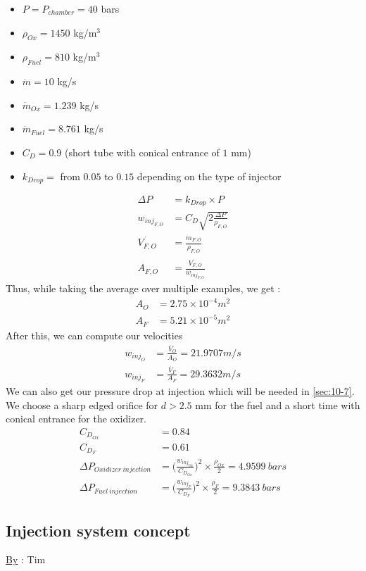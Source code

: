 \begin{itemize}
	\itemsep0em 
	\item $ P = P_{chamber} = 40$ bars
	\item $\rho_{Ox} = 1450$ kg/m$^3$
	\item $\rho_{Fuel} = 810$ kg/m$^3$
	\item $\dot{m} = 10$ kg/s
	\item $\dot{m}_{Ox} = 1.239$ kg/s
	\item $\dot{m}_{Fuel} = 8.761$ kg/s
	\item $C_D = 0.9$ (short tube with conical entrance of $1$ mm)
	\item $k_{Drop} = $ from $0.05$ to $0.15$ depending on the type of injector
\end{itemize}
\begin{align}
\Delta P &= k_{Drop}\times P\\
w_{inj_{F,O}} &= C_D \sqrt{2\frac{\Delta P}{\rho_{F,O}}} \\
\dot{V_{F,O}} &= \frac{\dot{m}_{F, O}}{\rho_{F,O}}\\
A_{F, O} &= \frac{\dot{V_{F,O}}}{w_{inj_{F,O}}}
\end{align}
Thus, while taking the average over multiple examples, we get :
\begin{align}
A_O & = 2.75\times 10^{-4} m^2\\
A_{F} &= 5.21\times 10^{-5} m^2
\end{align}
After this, we can compute our velocities
\begin{align}
w_{inj_{O}} &= \frac{\dot{V_O}}{A_O} = 21.9707 m/s\\
w_{inj_{F}} &= \frac{\dot{V_F}}{A_F} = 29.3632 m/s
\end{align} 
We can also get our pressure drop at injection which will be needed in \autoref{sec:10-7}. We choose a sharp edged orifice for $d>2.5$ mm for the fuel and a short time with conical entrance for the oxidizer.
\begin{align}
C_{D_{Ox}} &= 0.84\\
C_{D_F} &= 0.61\\
\Delta P_{Oxidizer\ injection} &= \bigg(\frac{w_{inj_{Ox}}}{C_{D_{Ox}}}\bigg)^2 \times \frac{\rho_{Ox}}{2} = 4.9599\ bars\\
\Delta P_{Fuel\ injection} &= \bigg(\frac{w_{inj_F}}{C_{D_F}}\bigg)^2 \times \frac{\rho_F}{2} = 9.3843\ bars 
\end{align}

\subsection{Injection system concept}
\qquad \underline{By} : Tim\\

